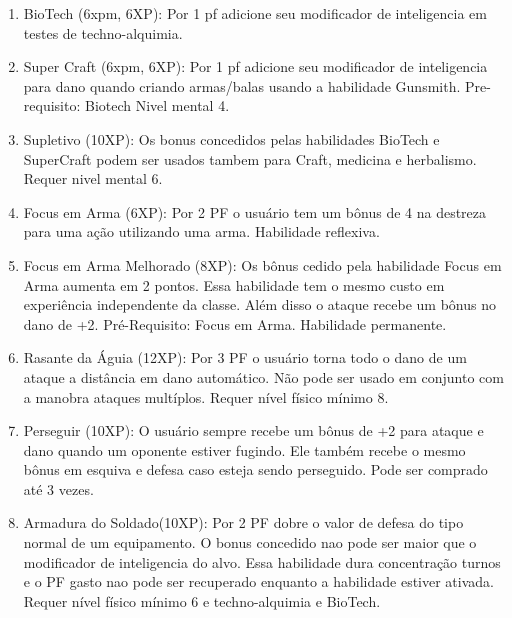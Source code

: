 \begin{enumerate}

	
	\item BioTech (6xpm, 6XP): Por 1 pf adicione seu modificador de inteligencia em testes de techno-alquimia.

	\item Super Craft (6xpm, 6XP): Por 1 pf adicione seu modificador de inteligencia para dano quando criando armas/balas usando a habilidade Gunsmith. Pre-requisito: Biotech Nivel mental 4.
	
	\item Supletivo (10XP): Os bonus concedidos pelas habilidades BioTech e SuperCraft podem ser usados tambem para Craft, medicina e herbalismo. Requer nivel mental 6.
	
	\item Focus em Arma (6XP): Por 2 PF o usuário tem um bônus de 4 na destreza para uma ação utilizando uma arma. Habilidade reflexiva.

	\item Focus em Arma Melhorado (8XP): Os bônus cedido pela habilidade Focus em Arma aumenta em 2 pontos. Essa habilidade tem o mesmo custo em experiência independente da classe. Além disso o ataque recebe um bônus no dano de +2. Pré-Requisito: Focus em Arma. Habilidade permanente.


	\item Rasante da Águia (12XP): Por 3 PF o usuário torna todo o dano de um ataque a distância em dano automático. Não pode ser usado em conjunto com a manobra ataques multíplos. Requer nível físico mínimo 8. 

	\item Perseguir (10XP): O usuário sempre recebe um bônus de +2 para ataque e dano quando um oponente estiver fugindo. Ele também recebe o mesmo bônus em esquiva e defesa caso esteja sendo perseguido. Pode ser comprado até 3 vezes.


	\item Armadura do Soldado(10XP): Por 2 PF dobre o valor de defesa do tipo normal de um equipamento. O bonus concedido nao pode ser maior que o modificador de inteligencia do alvo. Essa habilidade dura concentração turnos e o PF gasto nao pode ser recuperado enquanto a habilidade estiver ativada. Requer nível físico mínimo 6 e techno-alquimia e BioTech. 


\end{enumerate}
